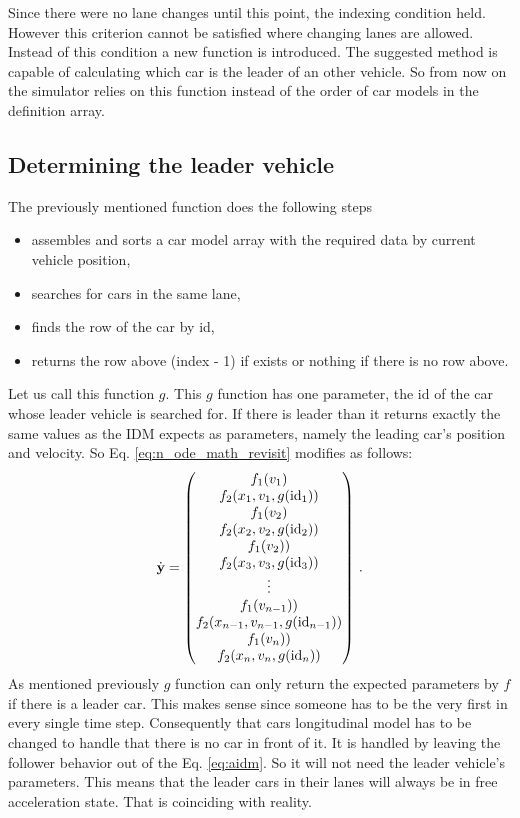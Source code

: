 		Since there were no lane changes until this point, the indexing condition held. However this criterion cannot be satisfied where changing lanes are allowed. Instead of this condition a new function is introduced. The suggested method is capable of calculating which car is the leader of an other vehicle. So from now on the simulator relies on this function instead of the order of car models in the definition array.
		\subsection*{Determining the leader vehicle}
		The previously mentioned function does the following steps
		\begin{itemize}
			\item assembles and sorts a car model array with the required data by current vehicle position,
			\item searches for cars in the same lane,
			\item finds the row of the car by id,
			\item returns the row above (index - 1) if exists or nothing if there is no row above.
		\end{itemize}
		Let us call this function $g$. This $g$ function has one parameter, the id of the car whose leader vehicle is searched for. If there is leader than it returns exactly the same values as the IDM expects as parameters, namely the leading car's position and velocity.
		So Eq. \eqref{eq:n_ode_math_revisit} modifies as follows:
		\begin{equation}
			\dot{\textbf{y}}=
			\begin{pmatrix}
			f_1(v_1)\\
			f_2(x_{1}, v_{1},g({\rm id}_1))\\
			f_1(v_2)\\
			f_2(x_{2}, v_{2},g({\rm id}_2))\\
			f_1(v_2))\\
			f_2(x_{3}, v_{3},g({\rm id}_3))\\
			\vdots\\
			f_1(v_{n-1}))\\
			f_2(x_{n-1}, v_{n-1},g({\rm id}_{n-1}))\\
			f_1(v_n))\\
			f_2(x_{n}, v_{n},g({\rm id}_{n}))
			\end{pmatrix}\,.
			\label{eq:n_ode_math_with_find_leading}
		\end{equation}
		As mentioned previously $g$ function can only return the expected parameters by $f$ if there is a leader car. This makes sense since someone has to be the very first in every single time step. Consequently that cars longitudinal model has to be changed to handle that there is no car in front of it. It is handled by leaving the follower behavior out of the Eq. \eqref{eq:aidm}. So it will not need the leader vehicle's parameters. This means that the leader cars in their lanes will always be in free acceleration state. That is coinciding with reality. 
